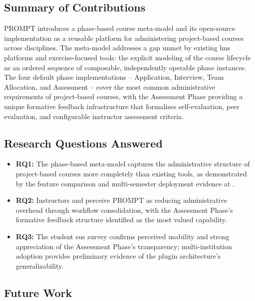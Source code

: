 
\label{sec:conclusion}

\subsection{Summary of Contributions}

PROMPT introduces a phase-based course meta-model and its open-source implementation as a reusable platform for administering project-based courses across disciplines.
The meta-model addresses a gap unmet by existing \acrshort{lms} platforms and exercise-focused tools:
the explicit modeling of the course lifecycle as an ordered sequence of composable, independently operable phase instances.
The four default phase implementations -- Application, Interview, Team Allocation, and Assessment -- cover the most common administrative requirements of project-based courses, with the Assessment Phase providing a unique formative feedback infrastructure that formalizes self-evaluation, peer evaluation, and configurable instructor assessment criteria.

\subsection{Research Questions Answered}

\begin{itemize}
    \item \textbf{RQ1:} The phase-based meta-model captures the administrative structure of project-based courses more completely than existing tools, as demonstrated by the feature comparison and multi-semester deployment evidence at \university{}.
    \item \textbf{RQ2:} Instructors and  perceive PROMPT as reducing administrative overhead through workflow consolidation, with the Assessment Phase's formative feedback structure identified as the most valued capability.
    \item \textbf{RQ3:} The student \acrshort{sus} survey confirms  perceived usability and strong appreciation of the Assessment Phase's transparency;
    multi-institution adoption provides preliminary evidence of the plugin architecture's generalizability.
\end{itemize}

\subsection{Future Work}

